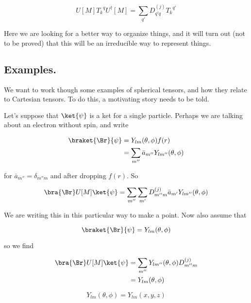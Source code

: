 \begin{equation}\label{eqn:qmTwoL19:310}
U[M] {T_k}^q U^\dagger[M] = \sum_{q'} D^{(j)}_{q' q} {T_k}^{q'}
\end{equation}

Here we are looking for a better way to organize things, and it will turn out (not to be proved) that this will be an irreducible way to represent things.

\subsection{Examples.}

We want to work though some examples of spherical tensors, and how they relate to Cartesian tensors.  To do this, a motivating story needs to be told.

Let's suppose that $\ket{\psi}$ is a ket for a single particle.  Perhaps we are talking about an electron without spin, and write

\begin{align*}
\braket{\Br}{\psi} 
&= Y_{lm}(\theta, \phi) f(r) \\
&= \sum_{m''} \bar{a}_{m''} Y_{l m''}(\theta, \phi) 
\end{align*}

for $\bar{a}_{m''} = \delta_{m'' m}$ and after dropping $f(r)$.  So

\begin{equation}\label{eqn:qmTwoL19:330}
\bra{\Br} U[M] \ket{\psi} 
=
\sum_{m''} 
\sum_{m'} 
D^{(j)}_{m'' m} \bar{a}_{m'} Y_{l m''}(\theta, \phi) 
\end{equation}

We are writing this in this particular way to make a point.  Now also assume that

\begin{equation}\label{eqn:qmTwoL19:350}
\braket{\Br}{\psi} = Y_{lm}(\theta, \phi)
\end{equation}

so we find

\begin{align*}
\bra{\Br} U[M] \ket{\psi} 
&=
\sum_{m''} 
Y_{l m''}(\theta, \phi) 
D^{(j)}_{m'' m} \\
&=
Y_{l m}(\theta, \phi) 
\end{align*}

\begin{equation}\label{eqn:qmTwoL19:370}
Y_{l m}(\theta, \phi)  = Y_{lm}(x, y, z)
\end{equation}

